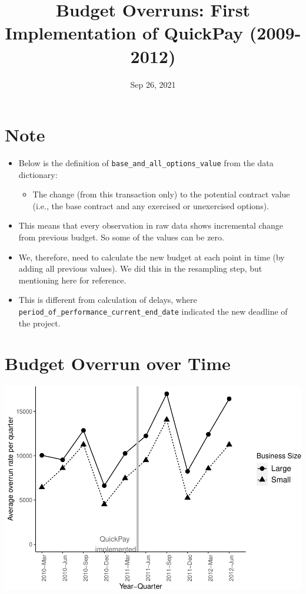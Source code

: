 \documentclass[
]{article}
\title{Budget Overruns: First Implementation of QuickPay (2009-2012)}
\author{}
\date{\vspace{-2.5em}Sep 26, 2021}
\providecommand{\tightlist}{%
  \setlength{\itemsep}{0pt}\setlength{\parskip}{0pt}}
\begin{document}
\maketitle

\hypertarget{note}{%
\section{Note}\label{note}}

\begin{itemize}
\tightlist
\item
  Below is the definition of \texttt{base\_and\_all\_options\_value}
  from the data dictionary:

  \begin{itemize}
  \tightlist
  \item
    The change (from this transaction only) to the potential contract
    value (i.e., the base contract and any exercised or unexercised
    options).
  \end{itemize}
\item
  This means that every observation in raw data shows incremental change
  from previous budget. So some of the values can be zero.
\item
  We, therefore, need to calculate the new budget at each point in time
  (by adding all previous values). We did this in the resampling step,
  but mentioning here for reference.
\item
  This is different from calculation of delays, where
  \texttt{period\_of\_performance\_current\_end\_date} indicated the new
  deadline of the project.
\end{itemize}

\hypertarget{budget-overrun-over-time}{%
\section{Budget Overrun over Time}\label{budget-overrun-over-time}}

\includegraphics{qp_first_budget_overrun_files/figure-latex/plot-1.pdf}
\end{document}
